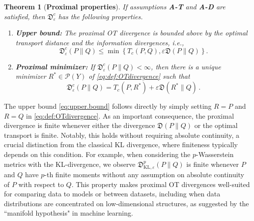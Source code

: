 \documentclass{amsart}
\newtheorem{theorem}{Theorem}[section]
\theoremstyle{definition}
\theoremstyle{remark}
\numberwithin{equation}{section}
\begin{document}
\begin{theorem}[\bf Proximal properties]\label{thm:proximal}
If assumptions {\bf A-T} and {\bf A-D} are satisfied, then $\mathfrak{D}^c_\varepsilon$ has the following properties. 
\begin{enumerate}
\item{\bf Upper bound:} The proximal OT divergence is bounded above by the optimal transport distance and the information divergences, i.e., %
\begin{equation}\label{eq:upper.bound}
\mathfrak{D}^c_{\varepsilon}(P\|Q)  \le \min \left\{  
T_{c}(P,Q),  \varepsilon \mathfrak{D}(P\|Q) \right\}. 
\end{equation}
\item{\bf %
Proximal minimizer:} If $\mathfrak{D}^c_\varepsilon(P\|Q) < \infty$, then  there is a unique minimizer $R^* \in \mathcal{P}(Y)$ of \eqref{eq:def:OTdivergence} such that
\begin{equation}\label{eq:minmizer}
\mathfrak{D}^c_\varepsilon(P\|Q)= T_c(P,R^*) + \varepsilon \mathfrak{D}(R^* \|Q) \,.
\end{equation}    
\end{enumerate}
\end{theorem}
 The upper bound \eqref{eq:upper.bound} follows directly by simply setting $R=P$ and $R=Q$ in \eqref{eq:def:OTdivergence}. As an important consequence,
the proximal divergence is finite whenever either the divergence $\mathfrak{D}(P\|Q)$ or the optimal transport is finite. Notably, this holds without requiring absolute continuity, a crucial distinction from the classical KL divergence, where finiteness typically depends on this condition. For example, when considering the $p$-Wasserstein metrics with the KL-divergence, we observe $\mathfrak{D}^p_{\mathrm{KL},\varepsilon}(P\|Q)$ is finite whenever $P$ and $Q$ have $p$-th finite moments without any assumption on absolute continuity of $P$ with respect to $Q$. This property makes proximal OT divergences well-suited for comparing data to models or between datasets, including when data distributions are concentrated on low-dimensional structures, as suggested by the ``manifold hypothesis" in machine learning.
\end{document}
